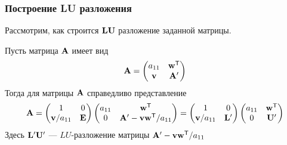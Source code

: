 \documentclass[apectratio=43,unicode]{beamer}
\begin{document}
\begin{frame}\frametitle{Построение LU разложения}
	Рассмотрим, как строится $\mathbf{L}\mathbf{U}$ разложение заданной матрицы.

	Пусть матрица $\mathbf{A}$ имеет вид
	\[
	\mathbf{A} = \begin{pmatrix}
		a_{11}& \mathbf{w}^{\mathsf{T}}\\
		\mathbf{v} & \mathbf{A}'\\
	\end{pmatrix}
	\]
	Тогда для матрицы $\mathbf{A}$ справедливо представление
	\[
	\mathbf{A} =
	\begin{pmatrix}
		1&0\\
		\mathbf{v}/a_{11}&\mathbf{E}
	\end{pmatrix}
	\begin{pmatrix}
		a_{11}&\mathbf{w}^{\mathsf{T}}\\
		0&\mathbf{A}' - \mathbf{v}\mathbf{w}^{\mathsf{T}}/a_{11}
	\end{pmatrix} =
	\begin{pmatrix}
		1&0\\
		\mathbf{v}/a_{11}&\mathbf{L}'
	\end{pmatrix}
	\begin{pmatrix}
		a_{11}&\mathbf{w}^{\mathsf{T}}\\
		0&\mathbf{U}'
	\end{pmatrix}
	\]
	Здесь $\mathbf{L}'\mathbf{U}'$ --- $LU$-разложение матрицы $\mathbf{A}' -\mathbf{v}\mathbf{w}^{\mathsf{T}}/a_{11}$
\end{frame}
\end{document}
